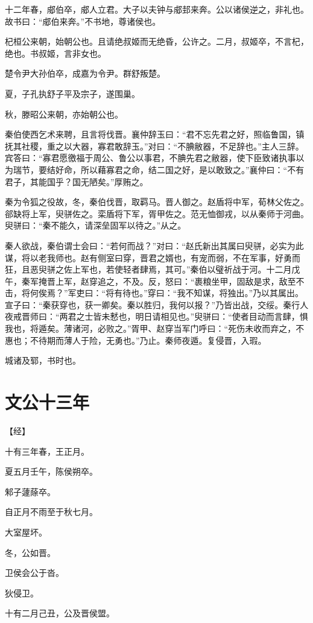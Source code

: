 \documentclass[a4paper,12pt,UTF8,twoside]{ctexbook}
\begin{document}
十二年春，郕伯卒，郕人立君。大子以夫钟与郕邽来奔。公以诸侯逆之，非礼也。故书曰：“郕伯来奔。”不书地，尊诸侯也。

杞桓公来朝，始朝公也。且请绝叔姬而无绝昏，公许之。二月，叔姬卒，不言杞，绝也。书叔姬，言非女也。

楚令尹大孙伯卒，成嘉为令尹。群舒叛楚。

夏，子孔执舒子平及宗子，遂围巢。

秋，滕昭公来朝，亦始朝公也。

秦伯使西乞术来聘，且言将伐晋。襄仲辞玉曰：“君不忘先君之好，照临鲁国，镇抚其社稷，重之以大器，寡君敢辞玉。”对曰：“不腆敝器，不足辞也。”主人三辞。宾答曰：“寡君愿徼福于周公、鲁公以事君，不腆先君之敝器，使下臣致诸执事以为瑞节，要结好命，所以藉寡君之命，结二国之好，是以敢致之。”襄仲曰：“不有君子，其能国乎？国无陋矣。”厚贿之。

秦为令狐之役故，冬，秦伯伐晋，取羁马。晋人御之。赵盾将中军，荀林父佐之。郤缺将上军，臾骈佐之。栾盾将下军，胥甲佐之。范无恤御戎，以从秦师于河曲。臾骈曰：“秦不能久，请深垒固军以待之。”从之。

秦人欲战，秦伯谓士会曰：“若何而战？”对曰：“赵氏新出其属曰臾骈，必实为此谋，将以老我师也。赵有侧室曰穿，晋君之婿也，有宠而弱，不在军事，好勇而狂，且恶臾骈之佐上军也，若使轻者肆焉，其可。”秦伯以璧祈战于河。十二月戊午，秦军掩晋上军，赵穿追之，不及。反，怒曰：“裹粮坐甲，固敌是求，敌至不击，将何俟焉？”军吏曰：“将有待也。”穿曰：“我不知谋，将独出。”乃以其属出。宣子曰：“秦获穿也，获一卿矣。秦以胜归，我何以报？”乃皆出战，交绥。秦行人夜戒晋师曰：“两君之士皆未慭也，明日请相见也。”臾骈曰：“使者目动而言肆，惧我也，将遁矣。薄诸河，必败之。”胥甲、赵穿当军门呼曰：“死伤未收而弃之，不惠也；不待期而薄人于险，无勇也。”乃止。秦师夜遁。复侵晋，入瑕。

城诸及郓，书时也。


\chapter{文公十三年}


【经】

十有三年春，王正月。

夏五月壬午，陈侯朔卒。

邾子蘧蒢卒。

自正月不雨至于秋七月。

大室屋坏。

冬，公如晋。

卫侯会公于沓。

狄侵卫。

十有二月己丑，公及晋侯盟。
\end{document}
